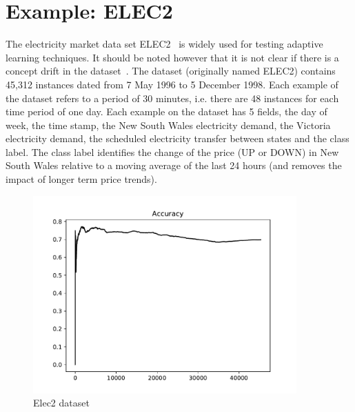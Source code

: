 \documentclass[doctoral,utf8,lot,loar,lof,shortloft,index]{jydiss}
\begin{document}
\section{Example: ELEC2}
The electricity market data set ELEC2~\cite{harries1999splice, gama2004learning} is widely used for testing adaptive learning techniques.
It should be noted however that it is not clear if there is a concept drift in the dataset~\cite{zliobaite2013good}. 
%
The dataset (originally named ELEC2) contains 45,312 instances dated from 7 May 1996 to 5 December 1998. 
Each example of the dataset refers to a period of 30 minutes, i.e. there are 48 instances for each time period of one day. 
Each example on the dataset has 5 fields, the day of week, the time stamp, the New South Wales electricity demand, the Victoria electricity demand, the scheduled electricity transfer between states and the class label. 
The class label identifies the change of the price (UP or DOWN) in New South Wales relative to a moving average of the last 24 hours (and removes the impact of longer term price trends). 
%
%
\begin{figure}[!htb]
	\centering
	\includegraphics[width=0.9\textwidth]{images/cd_example_elec2.pdf}
	\caption{Elec2 dataset}\label{fig:elec2}
\end{figure}
\end{document}
